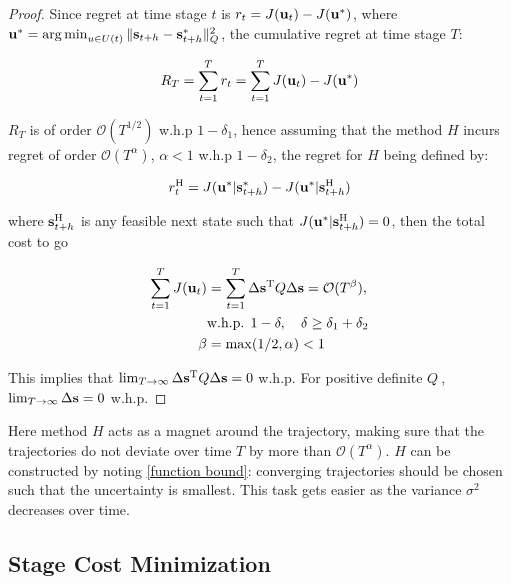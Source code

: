 \begin{proof}
Since regret at time stage $t$ is $r_{t} = J(\mathbf{u}_{t}) - J(\mathbf{u}^{*})$, where $\mathbf{u}^{*} = \operatorname*{arg\,min}_{u \in U(t)} \|\mathbf{s}_{t+h} - \mathbf{s}^{*}_{t+h}\|_{Q}^{2}$, the cumulative regret at time stage $T$:

\begin{equation}
R_{T} = \sum_{t=1}^{T}r_{t} = \sum_{t=1}^{T}J(\mathbf{u}_{t}) - J(\mathbf{u}^{*}) \label{cumRegret}
\end{equation}

$R_{T}$ is of order $\mathcal{O}(T^{1/2})$ w.h.p $1-\delta_{1}$, hence assuming that the method $H$ incurs regret of order $\mathcal{O}(T^{\alpha})$, $\alpha < 1$ w.h.p $1-\delta_{2}$, the regret for $H$ being defined by:

\begin{equation}
r_{t}^{\mathrm{H}} = J(\mathbf{u}^{*}|\mathbf{s}^{*}_{t+h}) - J(\mathbf{u}^{*}|\mathbf{s}^{\mathrm{H}}_{t+h})
\end{equation}

where $\mathbf{s}_{t+h}^{\mathrm{H}}$ is any feasible next state such that $J(\mathbf{u}^{*}|\mathbf{s}_{t+h}^{\mathrm{H}}) = 0$, then the total cost to go

\begin{align}
\sum_{t=1}^{T}J(\mathbf{u}_{t}) &= \sum_{t=1}^{T}\Delta\mathbf{s}^{\mathrm{T}}Q\Delta\mathbf{s} = \mathcal{O}(T^{\beta}), \\ & \text{w.h.p. } 1 - \delta, \quad \delta \geq \delta_{1} + \delta_{2} \\
\beta &= \max(1/2, \alpha) < 1
\end{align}

This implies that $\lim_{T \to \infty} \Delta\mathbf{s}^{\mathrm{T}}Q\Delta\mathbf{s} = 0$ w.h.p. For positive definite $Q \ $, $\lim_{T \to \infty} \Delta\mathbf{s} = 0$ w.h.p.

\end{proof}

Here method $H$ acts as a magnet around the trajectory, making sure that the trajectories do not deviate over time $T$ by more than $\mathcal{O}(T^{\alpha})$. $H$ can be constructed by noting \eqref{function bound}: converging trajectories should be chosen such that the uncertainty is smallest. This task gets easier as the variance $\sigma^{2}$ decreases over time.

\subsection{Stage Cost Minimization}
\label{StageCostMin}


